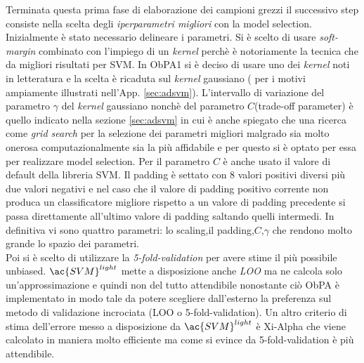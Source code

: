 Terminata questa prima fase di elaborazione dei campioni grezzi il successivo step consiste nella scelta degli \textit{iperparametri migliori} con la model selection. Inizialmente è stato necessario delineare i parametri. Si è scelto di usare  \textit{soft-margin} combinato con l'impiego di un \textit{kernel} perchè è notoriamente la tecnica che da migliori risultati per \ac{SVM}. In \ac{ObPA}1  si è deciso di usare uno dei \textit{kernel} noti in letteratura e la scelta è ricaduta sul \textit{kernel} gaussiano ( per i motivi ampiamente illustrati nell'App. \ref{sec:adsvm}). L'intervallo di variazione del parametro $\gamma$ del \textit{kernel} gaussiano nonchè del parametro $C$(trade-off parameter) è quello indicato nella sezione \ref{sec:adsvm} in cui è anche spiegato che una ricerca come \textit{grid search} per la selezione dei parametri migliori malgrado sia molto onerosa computazionalmente sia la più affidabile e per questo si è optato per essa per realizzare model selection.  Per il parametro $C$ è anche usato il valore di default della libreria \ac{SVM}. Il padding è settato con 8 valori positivi diversi più due valori negativi e nel caso che il valore di padding positivo corrente non produca un classificatore migliore rispetto a un valore di padding precedente si passa direttamente all'ultimo valore di padding saltando quelli intermedi. In definitiva vi sono quattro parametri: lo scaling,il padding,$C$,$\gamma$ che rendono molto grande lo spazio dei parametri.\\
 Poi si è scelto di utilizzare la \textit{5-fold-validation} per avere stime il più possibile unbiased. $\ac{SVM}^{light}$ mette a disposizione anche \textit{LOO} ma ne calcola solo un'approssimazione e quindi non del tutto attendibile nonostante ciò  \ac{ObPA} è implementato in modo tale da potere scegliere dall'esterno la preferenza sul metodo di validazione incrociata (LOO o 5-fold-validation).  Un altro criterio di stima dell'errore messo a disposizione da $\ac{SVM}^{light}$ è  Xi-Alpha che viene calcolato in maniera molto efficiente ma come si evince da \cite{Duan03} 5-fold-validation è più attendibile.  
 

